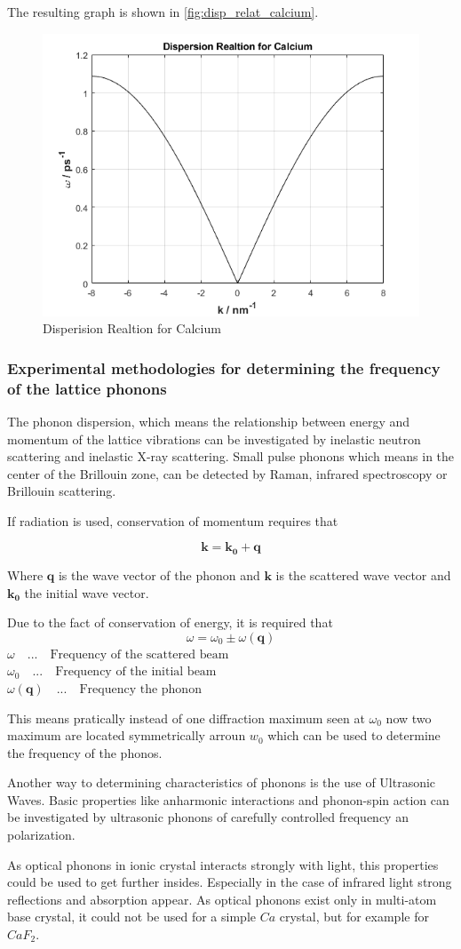 The resulting graph is shown in \autoref{fig:disp_relat_calcium}.
\begin{figure}[H]
	\centering
	\includegraphics[width=0.7\linewidth]{Graphics/Chapter3/disp_relat_calcium}
	\caption{Disperision Realtion for Calcium}
	\label{fig:disp_relat_calcium}
\end{figure}

\subsubsection*{Experimental methodologies for determining the frequency of the lattice phonons}

The phonon dispersion, which means the relationship between energy and momentum of the 
lattice vibrations can be investigated by inelastic neutron scattering and inelastic 
X-ray scattering. Small pulse phonons which means in the center of the Brillouin zone, 
can be detected by Raman, infrared spectroscopy or Brillouin scattering.

If radiation is used, conservation of momentum requires that

$$\mathbf{k} = \mathbf{k_0} + \mathbf{q}$$

Where $\mathbf{q}$ is the wave vector of the phonon and $\mathbf{k}$
is the scattered wave vector and $\mathbf{k_0}$ the initial wave vector.

Due to the fact of conservation of energy, it is required that
$$\omega = \omega_0 \pm \omega(\mathbf{q})$$
$\omega  \quad ... \quad \textrm{Frequency of the scattered beam}$\\
$\omega_0  \quad ... \quad \textrm{Frequency of the initial beam}$\\
$\omega(\mathbf{q})  \quad ... \quad \textrm{Frequency the phonon}$

This means pratically instead of one diffraction maximum seen at $\omega_0$ 
now two maximum are located symmetrically arroun $w_0$ which can be used 
to determine the frequency of the phonos.

Another way to determining characteristics of phonons is the use of Ultrasonic Waves.
Basic properties like anharmonic interactions and phonon-spin action can be investigated
by ultrasonic phonons of carefully controlled frequency an polarization.

As optical phonons in ionic crystal interacts strongly with light, this properties
could be used to get further insides. Especially in the case of infrared light
strong reflections and absorption appear. As optical phonons exist only in multi-atom
base crystal, it could not be used for a simple $Ca$ crystal, but for example for
$CaF_2$.